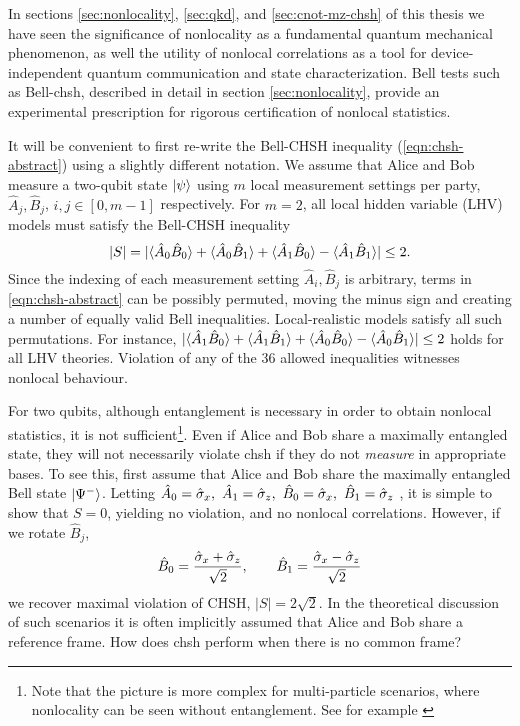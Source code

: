 In sections \ref{sec:nonlocality}, \ref{sec:qkd}, and \ref{sec:cnot-mz-chsh} of this thesis we have seen the significance of nonlocality as a fundamental quantum mechanical phenomenon, as well the utility of nonlocal correlations as a tool for device-independent quantum communication and state characterization.
Bell tests such as Bell-\acrshort{chsh}, described in detail in section \ref{sec:nonlocality}, provide an experimental prescription for rigorous certification of nonlocal statistics. 

It will be convenient to first re-write the Bell-CHSH inequality (\ref{eqn:chsh-abstract}) using a slightly different notation.  We assume that Alice and Bob measure a two-qubit state $\mbox{$ | \psi \rangle $}$ using $m$ local measurement settings per party, $\hat{A}_j, \hat{B}_j$, $i, j \in \left[0, m -1 \right]$ respectively.  For $m=2$, all local hidden variable (LHV) models must satisfy the Bell-CHSH inequality
\begin{equation}
        |S| = |\langle \hat{A}_0 \hat{B}_0 \rangle + 
        \langle \hat{A}_0 \hat{B}_1 \rangle + 
        \langle \hat{A}_1 \hat{B}_0 \rangle - 
        \langle \hat{A}_1 \hat{B}_1 \rangle|
        \le 2.
\label{eqn:chsh-two}
\end{equation}
Since the indexing of each measurement setting $\hat{A}_i, \hat{B}_j$ is arbitrary, terms in \ref{eqn:chsh-abstract} can be possibly permuted, moving the minus sign and creating a number of equally valid Bell inequalities. Local-realistic models satisfy all such permutations. 
For instance, 
       $|\langle \hat{A}_1 \hat{B}_0 \rangle + 
        \langle \hat{A}_1 \hat{B}_1 \rangle + 
        \langle \hat{A}_0 \hat{B}_0 \rangle - 
        \langle \hat{A}_0 \hat{B}_1 \rangle|
        \le 2$
holds for all LHV theories. Violation of any of the 36 allowed inequalities witnesses nonlocal behaviour.

For two qubits, although entanglement is necessary in order to obtain nonlocal statistics, it is not sufficient\footnote{Note that the picture is more complex for multi-particle scenarios, where nonlocality can be seen without entanglement. See for example \cite{Bennett1999b}}. Even if Alice and Bob share a maximally entangled state, they will not necessarily violate \gls{chsh} if they do not \emph{measure} in appropriate bases.  
To see this, first assume that Alice and Bob share the maximally entangled Bell state $\mbox{$ | \Psi^- \rangle $}$. 
Letting 
$\hat{A}_0 = \hat{\sigma}_x,~ \hat{A}_1 = \hat{\sigma}_z,~ \hat{B}_0 = \hat{\sigma}_x,~ \hat{B}_1 = \hat{\sigma}_z$
, it is simple to show that $S = 0$, yielding no violation, and no nonlocal correlations. 
However, if we rotate $\hat{B}_j$,
\begin{equation}
\hat{B}_0 = \frac{ \hat{\sigma}_x + \hat{\sigma}_z }{\sqrt{2}},~~~~~~ \hat{B}_1 = \frac{ \hat{\sigma}_x - \hat{\sigma}_z }{ \sqrt{2}}   
\end{equation}
 we recover maximal violation of CHSH, $|S|=2\sqrt{2}$. In the theoretical discussion of such scenarios it is often implicitly assumed that Alice and Bob share a reference frame. How does \gls{chsh} perform when there is no common frame?

